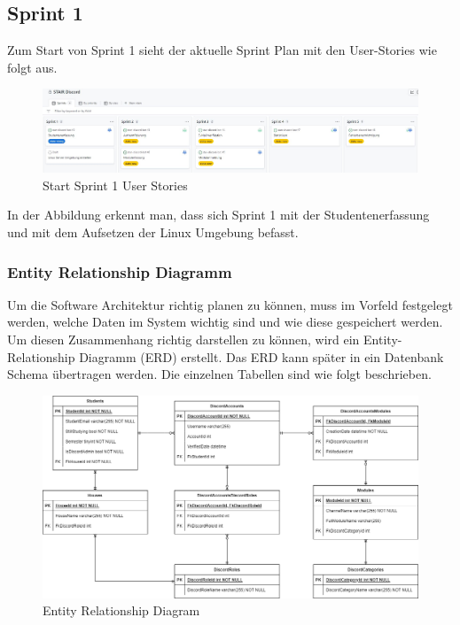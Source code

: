 \documentclass[a4paper, table]{article}
\begin{document}
\newpage
\subsection{Sprint 1}
Zum Start von Sprint 1 sieht der aktuelle Sprint Plan mit den User-Stories wie folgt aus.
\begin{figure}[h]
    \centering
    \hspace*{-2cm}
    \includegraphics[width=1.3\textwidth]{img/Start_Sprint1_Stories.jpg}
    \caption{Start Sprint 1 User Stories}
    \label{fig:start_sprint_one}
\end{figure}

In der Abbildung erkennt man, dass sich Sprint 1 mit der Studentenerfassung und
mit dem Aufsetzen der Linux Umgebung befasst.

\subsubsection{Entity Relationship Diagramm}\label{entity-relationship-diagramm}
Um die Software Architektur richtig planen zu können, muss im Vorfeld festgelegt werden,
welche Daten im System wichtig sind und wie diese gespeichert werden.
Um diesen Zusammenhang richtig darstellen zu können, wird ein Entity-Relationship Diagramm (ERD) erstellt.
Das ERD kann später in ein Datenbank Schema übertragen werden.
Die einzelnen Tabellen sind wie folgt beschrieben.

\begin{figure}[h]
    \centering
    \includegraphics[width=1\textwidth]{img/ER-Diagramm.png}
    \caption{Entity Relationship Diagram}
    \label{fig:ER-Diagram}
\end{figure}
\end{document}
